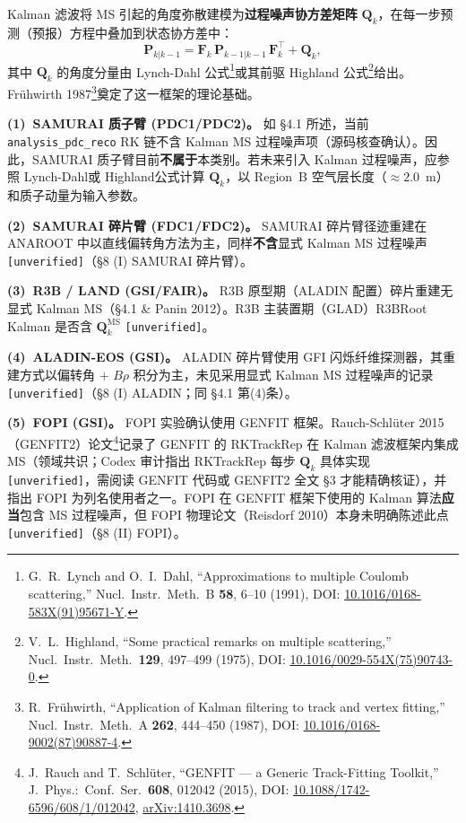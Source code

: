 \documentclass[a4paper, 11pt]{article}
\begin{document}
Kalman 滤波将 MS 引起的角度弥散建模为\textbf{过程噪声协方差矩阵} $\mathbf{Q}_k$，在每一步预测（预报）方程中叠加到状态协方差中：
\begin{equation}
\mathbf{P}_{k|k-1} = \mathbf{F}_k\,\mathbf{P}_{k-1|k-1}\,\mathbf{F}_k^{\top} + \mathbf{Q}_k,
\end{equation}
其中 $\mathbf{Q}_k$ 的角度分量由 Lynch-Dahl 公式\footnote{\label{fn:lynch1991}G.~R.~Lynch and O.~I.~Dahl, ``Approximations to multiple Coulomb scattering,'' Nucl.\ Instr.\ Meth.\ B \textbf{58}, 6--10 (1991), DOI: \href{https://doi.org/10.1016/0168-583X(91)95671-Y}{10.1016/0168-583X(91)95671-Y}.}或其前驱 Highland 公式\footnote{\label{fn:highland1975}V.~L.~Highland, ``Some practical remarks on multiple scattering,'' Nucl.\ Instr.\ Meth.\ \textbf{129}, 497--499 (1975), DOI: \href{https://doi.org/10.1016/0029-554X(75)90743-0}{10.1016/0029-554X(75)90743-0}.}给出。Frühwirth 1987\footnote{\label{fn:fruhwirth1987}R.~Frühwirth, ``Application of Kalman filtering to track and vertex fitting,'' Nucl.\ Instr.\ Meth.\ A \textbf{262}, 444--450 (1987), DOI: \href{https://doi.org/10.1016/0168-9002(87)90887-4}{10.1016/0168-9002(87)90887-4}.}奠定了这一框架的理论基础。

\textbf{(1)~SAMURAI 质子臂 (PDC1/PDC2)。}
如 §4.1 所述，当前 \texttt{analysis\_pdc\_reco} RK 链不含 Kalman MS 过程噪声项（源码核查确认）。因此，SAMURAI 质子臂目前\textbf{不属于}本类别。若未来引入 Kalman 过程噪声，应参照 Lynch-Dahl或 Highland公式计算 $\mathbf{Q}_k$，以 Region~B 空气层长度（$\approx 2.0$~m）和质子动量为输入参数。

\textbf{(2)~SAMURAI 碎片臂 (FDC1/FDC2)。}
SAMURAI 碎片臂径迹重建在 ANAROOT 中以直线偏转角方法为主，同样\textbf{不含}显式 Kalman MS 过程噪声 \texttt{[unverified]}（§8 (I) SAMURAI 碎片臂）。

\textbf{(3)~R3B / LAND (GSI/FAIR)。}
R3B 原型期（ALADIN 配置）碎片重建无显式 Kalman MS（§4.1 \& Panin 2012）。R3B 主装置期（GLAD）R3BRoot Kalman 是否含 $\mathbf{Q}_k^{\mathrm{MS}}$ \texttt{[unverified]}。

\textbf{(4)~ALADIN-EOS (GSI)。}
ALADIN 碎片臂使用 GFI 闪烁纤维探测器，其重建方式以偏转角 + $B\rho$ 积分为主，未见采用显式 Kalman MS 过程噪声的记录 \texttt{[unverified]}（§8 (I) ALADIN；同 §4.1 第(4)条）。

\textbf{(5)~FOPI (GSI)。}
FOPI 实验确认使用 GENFIT 框架。Rauch-Schlüter 2015（GENFIT2）论文\footnote{\label{fn:genfit2}J.~Rauch and T.~Schlüter, ``GENFIT --- a Generic Track-Fitting Toolkit,'' J.\ Phys.:\ Conf.\ Ser.\ \textbf{608}, 012042 (2015), DOI: \href{https://doi.org/10.1088/1742-6596/608/1/012042}{10.1088/1742-6596/608/1/012042}, \href{https://arxiv.org/abs/1410.3698}{arXiv:1410.3698}.}记录了 GENFIT 的 RKTrackRep 在 Kalman 滤波框架内集成 MS（领域共识；Codex 审计指出 RKTrackRep 每步 $\mathbf{Q}_k$ 具体实现 \texttt{[unverified]}，需阅读 GENFIT 代码或 GENFIT2 全文 §3 才能精确核证），并指出 FOPI 为列名使用者之一。FOPI 在 GENFIT 框架下使用的 Kalman 算法\textbf{应当}包含 MS 过程噪声，但 FOPI 物理论文（Reisdorf 2010）本身未明确陈述此点 \texttt{[unverified]}（§8 (II) FOPI）。
\end{document}
